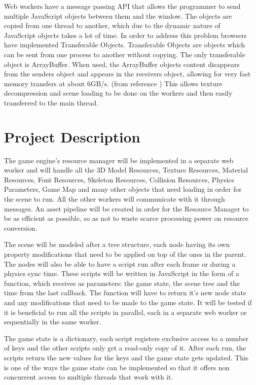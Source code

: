 Web workers have a message passing API that allows the programmer to send multiple JavaScript objects between them and the window. The objects are copied from one thread to another, which due to the dynamic nature of JavaScript objects takes a lot of time. In order to address this problem browsers have implemented Transferable Objects. Transferable Objects are objects which can be sent from one process to another without copying. The only transferable object is ArrayBuffer. When used, the ArrayBuffer objects content disappears from the senders object and appears in the receivers object, allowing for very fast memory transfers at about 6GB/s. (from reference \cite{bidelman11}) This allows texture decompression and scene loading to be done on the workers and then easily transferred to the main thread.



\section{Project Description}
\label{proj-desc}

The game engine's resource manager will be implemented in a separate web worker and will handle all the 3D Model Resources, Texture Resources, Material Resources, Font Resources, Skeleton Resources, Collision Resources, Physics Parameters, Game Map and many other objects that need loading in order for the scene to run. All the other workers will communicate with it through messages. An asset pipeline will be created in order for the Resource Manager to be as efficient as possible, so as not to waste scarce processing power on resource conversion.

The scene will be modeled after a tree structure, each node having its own property modifications that need to be applied on top of the ones in the parent. The nodes will also be able to have a script run after each frame or during a physics sync time. These scripts will be written in JavaScript in the form of a function, which receives as parameters: the game state, the scene tree and the time from the last callback. The function will have to return it's new node state and any modifications that need to be made to the game state. It will be tested if it is beneficial to run all the scripts in parallel, each in a separate web worker or sequentially in the same worker.


The game state is a dictionary, each script registers exclusive access to a number of keys and the other scripts only get a read-only copy of it. After each run, the scripts return the new values for the keys and the game state gets updated. This is one of the ways the game state can be implemented so that it offers non concurrent access to multiple threads that work with it.


